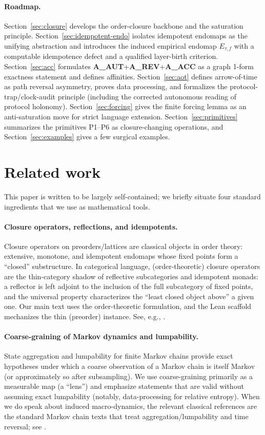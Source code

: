 \documentclass[11pt]{article}
\theoremstyle{remark}
\begin{document}
\paragraph{Roadmap.}
Section~\ref{sec:closure} develops the order-closure backbone and the saturation principle.
Section~\ref{sec:idempotent-endo} isolates idempotent endomaps as the unifying abstraction and introduces the induced empirical endomap $E_{\tau,f}$ with a computable idempotence defect and a qualified layer-birth criterion.
Section~\ref{sec:acc} formulates \textbf{A\_AUT}+\textbf{A\_REV}+\textbf{A\_ACC} as a graph 1-form exactness statement and defines affinities.
Section~\ref{sec:aot} defines arrow-of-time as path reversal asymmetry, proves data processing, and formalizes the protocol-trap/clock-audit principle (including the corrected autonomous reading of protocol holonomy).
Section~\ref{sec:forcing} gives the finite forcing lemma as an anti-saturation move for strict language extension.
Section~\ref{sec:primitives} summarizes the primitives P1--P6 as closure-changing operations, and Section~\ref{sec:examples} gives a few surgical examples.

\section{Related work}\label{sec:related}

This paper is written to be largely self-contained; we briefly situate four standard ingredients that
we use as mathematical tools.

\paragraph{Closure operators, reflections, and idempotents.}
Closure operators on preorders/lattices are classical objects in order theory: extensive, monotone,
and idempotent endomaps whose fixed points form a ``closed'' substructure.
In categorical language, (order-theoretic) closure operators are the thin-category shadow of
reflective subcategories and idempotent monads: a reflector is left adjoint to the inclusion of the
full subcategory of fixed points, and the universal property characterizes the ``least closed object
above'' a given one.
Our main text uses the order-theoretic formulation, and the Lean scaffold mechanizes the thin
(preorder) instance. See, e.g., \cite{DaveyPriestley2002,MacLane1998,Borceux1994}.

\paragraph{Coarse-graining of Markov dynamics and lumpability.}
State aggregation and lumpability for finite Markov chains provide exact hypotheses under which a
coarse observation of a Markov chain is itself Markov (or approximately so after subsampling).
We use coarse-graining primarily as a measurable map (a ``lens'') and emphasize statements that are
valid without assuming exact lumpability (notably, data-processing for relative entropy).
When we do speak about induced macro-dynamics, the relevant classical references are the standard
Markov chain texts that treat aggregation/lumpability and time reversal; see
\cite{KemenySnell1960,Norris1997}.
\end{document}
